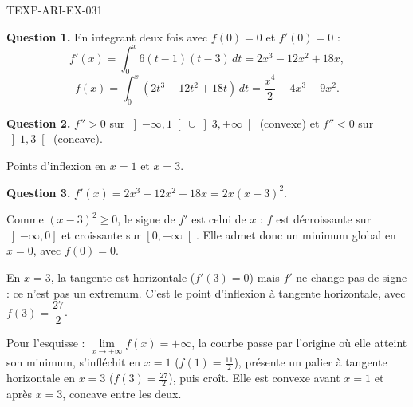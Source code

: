\begin{corrige}{TEXP-ARI-EX-031}

\textbf{Question 1.} En integrant deux fois avec $f(0)=0$ et $f'(0)=0$ :
\[ f'(x) = \int_0^x 6(t-1)(t-3)\,dt = 2x^3 - 12x^2 + 18x, \]
\[ f(x) = \int_0^x (2t^3 - 12t^2 + 18t)\,dt = \frac{x^4}{2} - 4x^3 + 9x^2. \]


\textbf{Question 2.} $f'' > 0$ sur $\left]-\infty, 1\right[ \cup \left]3, +\infty\right[$ (convexe) et $f'' < 0$ sur $\left]1, 3\right[$ (concave).

Points d'inflexion en $x = 1$ et $x = 3$.

\textbf{Question 3.} $f'(x) = 2x^3 - 12x^2 + 18x = 2x(x-3)^2$.

Comme $(x-3)^2 \geq 0$, le signe de $f'$ est celui de $x$ : $f$ est décroissante
sur $\left]-\infty,0\right]$ et croissante sur $\left[0,+\infty\right[$. Elle admet
donc un minimum global en $x=0$, avec $f(0)=0$.

En $x=3$, la tangente est horizontale ($f'(3)=0$) mais $f'$ ne change pas de
signe : ce n'est pas un extremum. C'est le point d'inflexion à tangente
horizontale, avec $f(3)=\dfrac{27}{2}$.

Pour l'esquisse : $\lim\limits_{x\to\pm\infty} f(x) = +\infty$, la courbe passe par
l'origine où elle atteint son minimum, s'infléchit en $x=1$ ($f(1)=\frac{11}{2}$),
présente un palier à tangente horizontale en $x=3$ ($f(3)=\frac{27}{2}$), puis
croît. Elle est convexe avant $x=1$ et après $x=3$, concave entre les deux.

\end{corrige}

